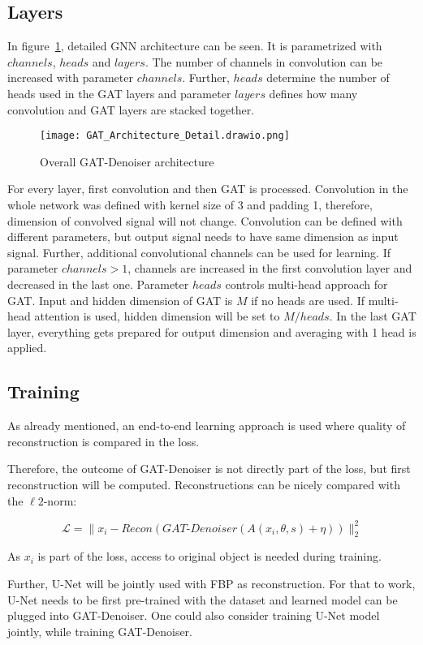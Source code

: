 \subsection{Layers}
In figure~\ref{fig:architecture-detailed}, detailed GNN architecture can be seen.
It is parametrized with $channels$, $heads$ and $layers$. 
The number of channels in convolution can be increased with parameter $channels$.
Further, $heads$ determine the number of heads used in the GAT layers and parameter 
$layers$ defines how many convolution and GAT layers are stacked together.


\begin{figure}[H]
  \centering
  \label{fig:architecture-detailed}
  \texttt{[image: GAT\_Architecture\_Detail.drawio.png]}
  \caption{Overall GAT-Denoiser architecture}
\end{figure}


For every layer, first convolution and then GAT is processed. 
Convolution in the whole network was defined with kernel size of 3 and padding 1,
therefore, dimension of convolved signal will not change. 
Convolution can be defined with different parameters, but output signal needs to have 
same dimension as input signal.
Further, additional convolutional channels can be used for learning.
If parameter $channels > 1$, channels are increased in the first convolution layer 
and decreased in the last one.
Parameter $heads$ controls multi-head approach for GAT. Input and hidden dimension
of GAT is $M$ if no heads are used.
If multi-head attention is used, hidden dimension will be set to $M / heads$.
In the last GAT layer, everything gets prepared for output dimension and 
averaging with 1 head is applied.




\subsection{Training}

As already mentioned, an end-to-end learning approach is used where quality of reconstruction is 
compared in the loss.

Therefore, the outcome of GAT-Denoiser is not directly part of the loss, but first reconstruction will be computed.
Reconstructions can be nicely compared with the $\ell2$-norm:

\begin{equation}
  \mathcal{L} = \parallel x_i - \textit{Recon} ( \textit{GAT-Denoiser}(A(x_i, \theta, s) + \eta)) \parallel ^2_2
\end{equation}

As $x_i$ is part of the loss, access to original object is needed during training.

Further, U-Net will be jointly used with FBP as reconstruction. For that to work, U-Net needs to be 
first pre-trained with the dataset and learned model can be plugged into GAT-Denoiser.
One could also consider training U-Net model jointly, while training GAT-Denoiser.


